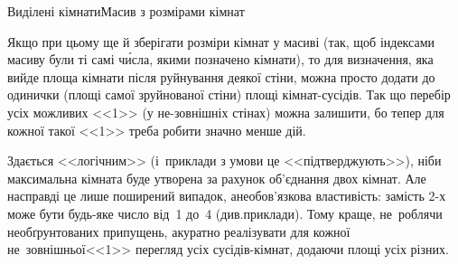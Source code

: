 \documentclass[14pt,a4paper]{extarticle}
\begin{document}
\noindent\begin{minipage}{\textwidth}
\begin{exampleSimpleThreeWithSpecNameColTwo}{6em}{12em}{13em}{Виділені кімнати}{Масив з розмірами кімнат}%
%
\end{exampleSimpleThreeWithSpecNameColTwo}
\end{minipage}

Якщо при цьому ще й зберігати розміри кімнат у масиві (так, щоб індексами масиву були ті самі ч\'{и}сла, якими позначено кімнати), то для визначення, яка вийде площа кімнати після руйнування деякої стіни, можна просто додати до одинички (площі самої зруйнованої стіни) площі кімнат-сусідів. Так що перебір усіх можливих <<1>> (у не-зовнішніх стінах) можна залишити, бо тепер для кожної такої <<1>> треба робити значно менше дій.

Здається <<логічним>> (і~приклади з умови це <<підтверджують>>), ніби максимальна кімната буде утворена за рахунок об’єднання двох кімнат. Але насправді %
це лише поширений випадок, а\nolinebreak[3] не\nolinebreak[3] обов’язкова властивість: замість \mbox{2-х} може бути будь-яке число від~1 до~4 (див.\nolinebreak[2] приклади). Тому  краще, не~роблячи необґрунтованих припущень, акуратно реалізувати для кожної не~зовнішньої\nolinebreak[3] <<1>> перегляд усіх сусідів-кімнат, додаючи площі усіх різних.

\vspace{0.375\baselineskip}
\end{document}
